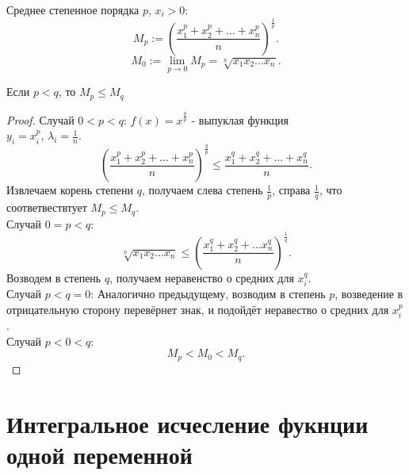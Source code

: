 \documentclass[11pt, oneside]{article}   	%
\begin{document}
\begin{definition}
    Среднее степенное порядка $p$, $x_i > 0$:
    \[ M_p := \left( \frac{x_1^{p}+x_2^{p} + \ldots + x_{n}^{p}}{n} \right)^{\frac{1}{p}}  .\]
    \[ M_0 := \lim\limits_{p \to 0} M_p = \sqrt[n]{x_1x_2\ldots x_n}  .\] 
\end{definition}
\begin{dlemma}
    Если $p < q$, то $M_{p} \le M_{q}$
    \begin{proof}
        Случай $0 < p < q$:
        $f(x) = x^{\frac{q}{p}}$ - выпуклая функция\\
        $y_i = x_i^{p}$, $\lambda_i = \frac{1}{n}$.\\
        \[ \left( \frac{x_1^{p}+x_2^{p}+\ldots+x_n^{p}}{n} \right)^{\frac{q}{p}} \le  \frac{x_{1}^{q}+x_2^{q}+\ldots+x_n^{q}}{n}  .\]
        Извлечаем корень степени $q$, получаем слева степень $\frac{1}{p}$, справа $\frac{1}{q}$, что соответвествтует $M_p \le M_{q}$.\\
        Случай $0 = p < q$:
        \[ \sqrt[n]{x_1x_2\ldots x_n} \le \left(\frac{x_1^{q}+x_2^{q}+\ldots x_n^{q}}{n}\right)^{\frac{1}{q}}  .\]
        Возводем в степень $q$, получаем неравенство о средних для $x_i^{q}$.\\
        Случай $p < q = 0$:
        Аналогично предыдущему, возводим в степень $p$, возведение в отрицательную сторону перевёрнет знак, и подойдёт неравество о средних для $x_i^{p}$.\\
        Случай $p < 0 < q$:
        \[ M_p < M_0 < M_q .\] 
    \end{proof}
\end{dlemma}
\section{Интегральное исчесление фукнции одной переменной}
\end{document}
